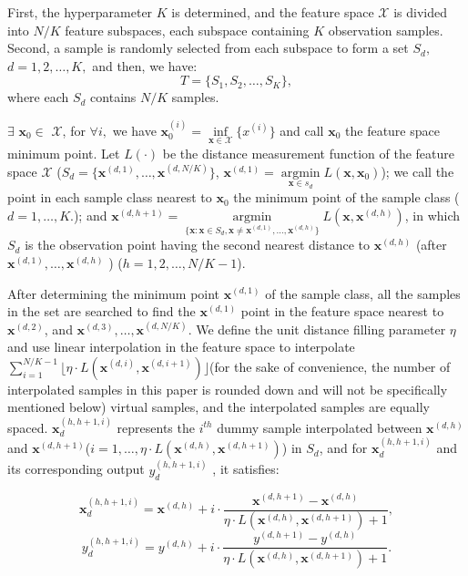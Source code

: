 \documentclass[mathematics,article,accept,pdftex,moreauthors]{Definitions/mdpi}
\begin{document}
First, the hyperparameter $K$ is determined, and the feature space $\mathcal{X}$ is divided into $N/K$ feature subspaces, each subspace containing $K$ observation samples. Second, a sample is randomly selected from each subspace to form a set $S_{d},$ $d=1,2,\ldots, K,$ and then, we have:
$$T=\{S_{1}, S_{2}, \ldots, S_{K}\},$$
where each $S_{d}$ contains $N/K$ samples.

$\exists$ $\bm{x}_{0} \in$ $\mathcal{X}$, for $\forall i,$ we have $\bm{x}_{0}^{(i)} =  \mathop{inf}\limits_{\bm{x} \in \mathcal{X} }\{x^{(i)}\}$  and call $\bm{x}_{0}$ the feature space minimum point. Let $L({\cdot})$ be the distance measurement function of the feature space $\mathcal{X}$ ($S_{d} = \{\bm{x}^{(d,1)}, \ldots, \bm{x}^{(d,N/K)}\}$, $\bm{x}^{(d,1)} = \mathop{argmin}\limits_{\bm{x} \in s_{d} }L(\bm{x}, \bm{x}_{0}) $); we call the point in each sample class nearest to $\bm{x}_{0}$ the minimum point of the sample class ($d = 1,\ldots, K.$); and $\bm{x}^{(d,h+1)} = \mathop{argmin}\limits_{\{\bm{x}:\bm{x}\in S_{d}, \bm{x}\neq\bm{x}^{(d,1)}, \ldots, \bm{x}^{(d,h)}\}}L(\bm{x}, \bm{x}^{(d,h)})$, in which  $S_{d}$ is the observation point having the second nearest distance to $\bm{x}^{(d,h)}$   (after $\bm{x}^{(d,1)}, \ldots, \bm{x}^{(d,h)}$ ) ($h=1, 2, \ldots, N/K-1 $).


After determining the minimum point $\bm{x}^{(d,1)}$ of the sample class, all the samples in the set are searched to find the $\bm{x}^{(d,1)}$ point in the feature space nearest to $\bm{x}^{(d,2)}$, and $\bm{x}^{(d,3)}, \ldots, \bm{x}^{(d,N/K)}. $ We define the unit distance filling parameter $\eta$ and use linear interpolation in the feature space to interpolate $\sum_{i=1}^{N/K-1} \lfloor  \eta \cdot L(\bm{x}^{(d,i)}, \bm{x}^{(d,i+1)}) \rfloor$(for the sake of convenience, the number of interpolated samples in this paper is rounded down and will not be specifically mentioned below) virtual samples, and the interpolated samples are equally spaced. $\bm{x}_{d}^{(h, h+1, i)}$ represents the $i^{th}$ dummy sample interpolated between $\bm{x}^{(d,h)}$ and $\bm{x}^{(d,h+1)}$($i=1,\ldots, \eta \cdot L(\bm{x}^{(d,h)}, \bm{x}^{(d,h+1)})$) in $S_{d}$, and for $\bm{x}_{d}^{(h,h+1,i)}$ and its corresponding output $y_{d}^{(h,h+1,i)}$  , it satisfies:


$$\bm{x}_{d}^{(h,h+1,i)} = \bm{x}^{(d,h)} + i\cdot \frac{\bm{x}^{(d,h+1)} - \bm{x}^{(d,h)}}{\eta \cdot L(\bm{x}^{(d,h)}, \bm{x}^{(d,h+1)})+1},$$
$${y}_{d}^{(h,h+1,i)} = y^{(d,h)} + i\cdot \frac{y^{(d,h+1)} - y^{(d,h)}}{\eta \cdot L(\bm{x}^{(d,h)}, \bm{x}^{(d,h+1)})+1}.$$
\end{document}
